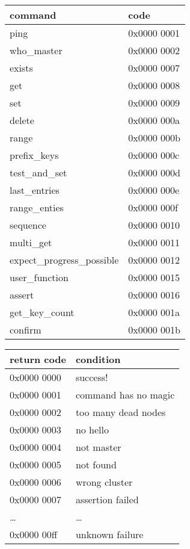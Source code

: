 \begin{table}[ht]
\begin{tabular}{|l|l|}
\hline
command & code \\
\hline
ping            & 0x0000 0001 \\
who\_master     & 0x0000 0002 \\
exists          & 0x0000 0007 \\
get             & 0x0000 0008 \\
set             & 0x0000 0009 \\
delete          & 0x0000 000a \\
range           & 0x0000 000b \\
prefix\_keys    & 0x0000 000c \\
test\_and\_set  & 0x0000 000d \\
last\_entries   & 0x0000 000e \\
range\_enties   & 0x0000 000f \\
sequence        & 0x0000 0010 \\
multi\_get      & 0x0000 0011 \\
expect\_progress\_possible & 0x0000 0012 \\
user\_function  & 0x0000 0015 \\
assert          & 0x0000 0016 \\
get\_key\_count & 0x0000 001a \\
confirm         & 0x0000 001b \\
\hline
\end{tabular}
\end{table}

\begin{table}[ht]
\begin{tabular}{|l|l|}
\hline
return code & condition \\
\hline
0x0000 0000  & success!  \\
0x0000 0001  & command has no magic  \\
0x0000 0002  & too many dead nodes \\
0x0000 0003  & no hello        \\
0x0000 0004  & not master      \\
0x0000 0005  & not found       \\
0x0000 0006  & wrong cluster   \\
0x0000 0007  & assertion failed \\
\ldots       & \ldots          \\
0x0000 00ff  & unknown failure \\
\end{tabular}
\end{table}
